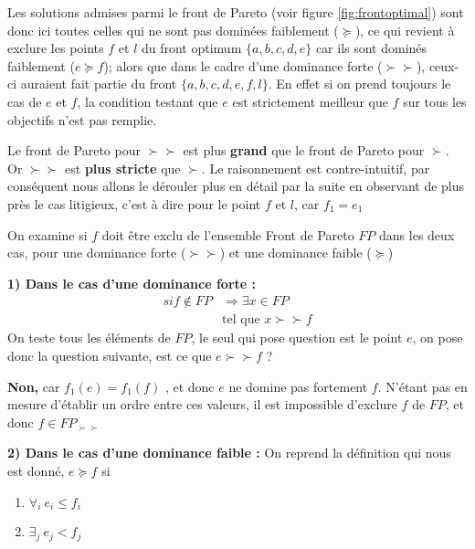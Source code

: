 Les solutions admises parmi le front de Pareto (voir figure \ref{fig:frontoptimal}) sont donc ici toutes celles qui ne sont pas dominées faiblement ($\succeq$), ce qui revient à exclure les points $f$ et $l$ du front optimum $\{a,b,c,d,e\}$ car ils sont dominés faiblement ($e \succeq f$); alors que dans le cadre d'une dominance forte ($\succ \succ$), ceux-ci auraient fait partie du front $\{a,b,c,d,e,f,l\}$. En effet si on prend toujours le cas de $e$ et $f$, la condition testant que $e$ est strictement meilleur que $f$ sur tous les objectifs n'est pas remplie. 


Le front de Pareto pour $\succ \succ$ est plus \textbf{grand} que le front de Pareto pour $ \succ $. Or $\succ \succ$ est \textbf{plus stricte} que $\succ$. Le raisonnement est contre-intuitif, par conséquent nous allons le dérouler plus en détail par la suite en observant de plus près le cas litigieux, c'est à dire pour le point $f$ et $l$, car $f_1 = e_1$

On examine si $f$ doit être exclu de l'ensemble Front de Pareto $FP$ dans les deux cas, pour une dominance forte ($\succ \succ$) et une dominance faible ($\succeq$)

\textbf{1) Dans le cas d'une dominance forte : }
\begin{align*}
     si f \notin FP & \Rightarrow \exists x \in FP \\
     & \text{tel que }  x \succ \succ f
\end{align*}
On teste tous les éléments de $FP$, le seul qui pose question est le point $e$, on pose donc la question suivante, est ce que $e \succ \succ f$ ?

\textbf{Non,} car $f_1(e) = f_1(f)$ , et donc $e$ ne domine pas fortement $f$. N'étant pas en mesure d'établir un ordre entre ces valeurs, il est impossible d'exclure $f$ de $FP$, et donc $ f \in FP_{\succ \succ}$

\textbf{2) Dans le cas d'une dominance faible : }
On reprend la définition qui nous est donné, $ e \succeq f$ si
\begin{enumerate}[label=(\arabic*),labelindent=\parindent,leftmargin=*]
\item $ \forall_i \ e_i \leq f_i$
\item $ \exists_j \ e_j < f_j$
\end{enumerate}

